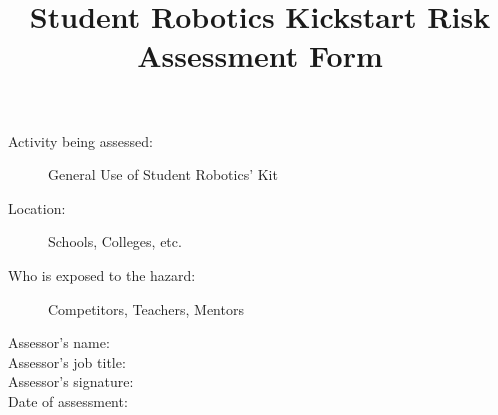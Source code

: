 \documentclass[12pt,a4paper]{scrartcl}
\title{Student Robotics Kickstart Risk Assessment Form}
\begin{document}
\maketitle

\begin{description}
\item[Activity being assessed:] General Use of Student Robotics' Kit
\item[Location:] Schools, Colleges, etc.
\item[Who is exposed to the hazard:] Competitors, Teachers, Mentors
\end{description}

\begin{description}
\item[Assessor's name:]
\item[Assessor's job title:]
\item[Assessor's signature:]
\item[Date of assessment:]
\end{description}
\clearpage

\newcommand{\risk}[3]{
 #1 & #2 & #3 \\
}
\end{document}
